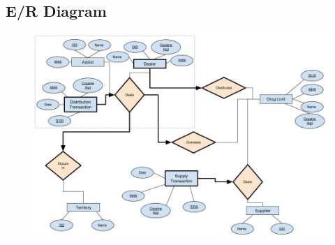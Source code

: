 \documentclass[11pt, oneside]{article}   	%
\theoremstyle{definition}
\theoremstyle{remark}
\begin{document}
\cleardoublepage
\subsection{E/R Diagram}

\begin{figure}[h]
\begin{center}
	\includegraphics[width=.9\textwidth]{ER_Diagram.jpg}
\end{center}
\end{figure}
\end{document}
